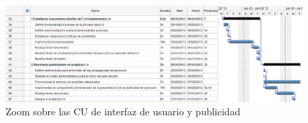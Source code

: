 \begin{landscape}
\begin{figure}[H]
\centering
\includegraphics[scale=\escaladefault]{graficos/gantt/subgantt3.png}
\caption{Zoom sobre las CU de interfaz de usuario y publicidad}
\end{figure}

\end{landscape}
